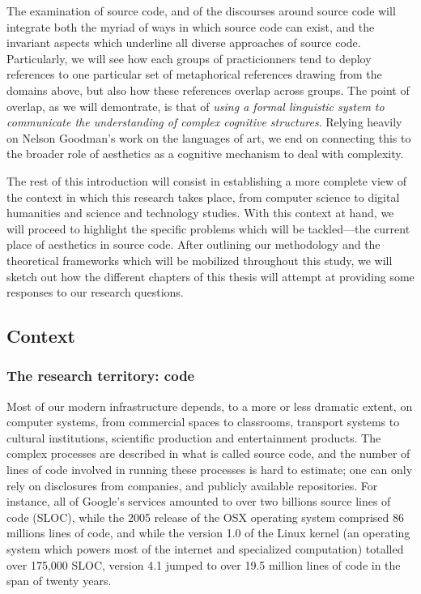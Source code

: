 The examination of source code, and of the discourses around source code will integrate both the myriad of ways in which source code can exist, and the invariant aspects which underline all diverse approaches of source code. Particularly, we will see how each groups of practicionners tend to deploy references to one particular set of metaphorical references drawing from the domains above, but also how these references overlap across groups. The point of overlap, as we will demontrate, is that of \emph{using a formal linguistic system to communicate the understanding of complex cognitive structures}. Relying heavily on Nelson Goodman's work on the languages of art\cite{goodman_languages_1976}, we end on connecting this to the broader role of aesthetics as a cognitive mechanism to deal with complexity.

The rest of this introduction will consist in establishing a more complete view of the context in which this research takes place, from computer science to digital humanities and science and technology studies. With this context at hand, we will proceed to highlight the specific problems which will be tackled—the current place of aesthetics in source code. After outlining our methodology and the theoretical frameworks which will be mobilized throughout this study, we will sketch out how the different chapters of this thesis will attempt at providing some responses to our research questions.

\subsection{Context}

\subsubsection{The research territory: code}

Most of our modern infrastructure depends, to a more or less dramatic extent, on computer systems\cite{kitchin_codespace_2011}, from commercial spaces to classrooms, transport systems to cultural institutions, scientific production and entertainment products. The complex processes are described in what is called source code, and the number of lines of code involved in running these processes is hard to estimate; one can only rely on disclosures from companies, and publicly available repositories. For instance, all of Google's services amounted to over two billions source lines of code (SLOC)\cite{scale_why_2015}, while the 2005 release of the OSX operating system comprised 86 millions lines of code, and while the version 1.0 of the Linux kernel (an operating system which powers most of the internet and specialized computation) totalled over 175,000 SLOC, version 4.1 jumped to over 19.5 million lines of code in the span of twenty years\cite{noauthor_linux_2021}.

